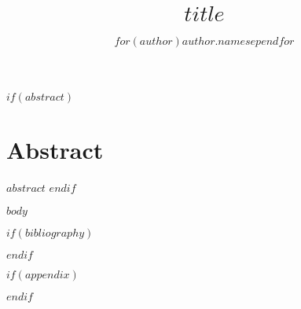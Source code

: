 \documentclass[letterpaper]{article}
\title{$title$}
\author{$for(author)$\mbox{$author.name$}$sep$\quad $endfor$}
\date{}
\begin{document}
\frenchspacing

\maketitle

\setnowidow[2]

$if(abstract)$
\section*{Abstract}
$abstract$
$endif$

$body$

$if(bibliography)$


$endif$

$if(appendix)$
\renewcommand\thefigure{S\arabic{figure}}
\renewcommand\thetable{S\arabic{table}}
\setcounter{figure}{0}
\setcounter{table}{0}
\clearpage
\appendix

$endif$
\end{document}
